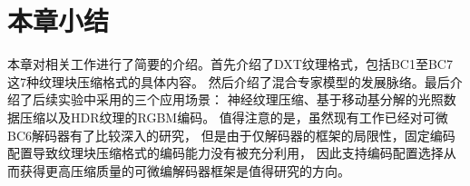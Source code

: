 

\section{本章小结}

本章对相关工作进行了简要的介绍。首先介绍了DXT纹理格式，包括BC1至BC7这7种纹理块压缩格式的具体内容。
然后介绍了混合专家模型的发展脉络。最后介绍了后续实验中采用的三个应用场景：
神经纹理压缩、基于移动基分解的光照数据压缩以及HDR纹理的RGBM编码。
值得注意的是，虽然现有工作已经对可微BC6解码器有了比较深入的研究，
但是由于仅解码器的框架的局限性，固定编码配置导致纹理块压缩格式的编码能力没有被充分利用，
因此支持编码配置选择从而获得更高压缩质量的可微编解码器框架是值得研究的方向。
